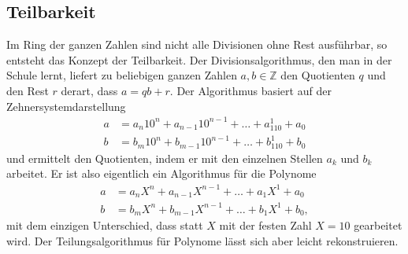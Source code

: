 %
%
\subsection{Teilbarkeit
\label{buch:subsection:polynome:teilbarkeit}}
Im Ring der ganzen Zahlen sind nicht alle Divisionen ohne Rest
ausführbar, so entsteht das Konzept der Teilbarkeit.
Der Divisionsalgorithmus, den man in der Schule lernt, liefert
zu beliebigen ganzen Zahlen $a,b\in\mathbb{Z}$ den Quotienten
$q$ und den Rest $r$ derart, dass $a=qb+r$.
Der Algorithmus basiert auf der Zehnersystemdarstellung 
\begin{align*}
a &= a_n10^{n} + a_{n-1}10^{n-1} + \dots + a_110^{1} + a_0
\\
b &= b_m10^{n} + b_{m-1}10^{n-1} + \dots + b_110^{1} + b_0
\end{align*}
und ermittelt den Quotienten, indem er mit den einzelnen Stellen
$a_k$ und $b_k$ arbeitet.
Er ist also eigentlich ein Algorithmus für die Polynome
\begin{align*}
a &= a_nX^{n} + a_{n-1}X^{n-1} + \dots + a_1X^{1} + a_0
\\
b &= b_mX^{n} + b_{m-1}X^{n-1} + \dots + b_1X^{1} + b_0,
\end{align*}
mit dem einzigen Unterschied, dass statt $X$ mit der festen Zahl $X=10$
gearbeitet wird.
Der Teilungsalgorithmus für Polynome lässt sich aber leicht
rekonstruieren.

